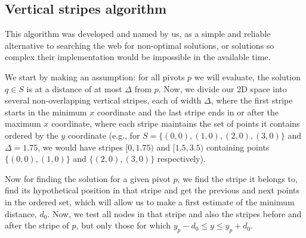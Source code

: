 \subsection{Vertical stripes algorithm} \label{algorithm-vstripes}
This algorithm was developed and named by us, as a simple and reliable alternative to searching the web for non-optimal solutions, or solutions so complex their implementation would be impossible in the available time.\par
We start by making an assumption: for all pivots $p$ we will evaluate, the solution $q \in S$ is at a distance of at most $\Delta$ from $p$. Now, we divide our 2D space into several non-overlapping vertical stripes, each of width $\Delta$, where the first stripe starts in the minimum $x$ coordinate and the last stripe ends in or after the maximum $x$ coordinate, where each stripe maintains the set of points it contains ordered by the $y$ coordinate (e.g., for $S=\{(0,0),(1,0),(2,0),(3,0)\}$ and $\Delta = 1.75$, we would have stripes $[0,1.75)$ and $[1.5, 3.5)$ containing points $\{(0,0),(1,0)\}$ and $\{(2,0),(3,0)\}$ respectively).\par
Now for finding the solution for a given pivot $p$, we find the stripe it belongs to, find its hypothetical position in that stripe and get the previous and next points in the ordered set, which will allow us to make a first estimate of the minimum distance, $d_0$. Now, we test all nodes in that stripe and also the stripes before and after the stripe of $p$, but only those for which $y_p - d_0 \leq y \leq y_p + d_0$.
